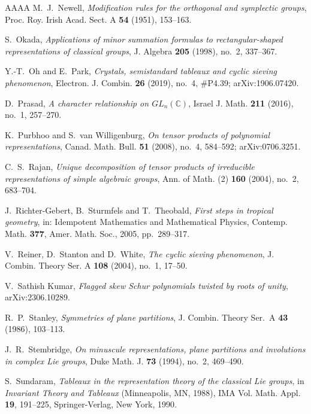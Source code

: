 \documentclass[11pt,reqno]{amsart}
\theoremstyle{plain}
\theoremstyle{definition}
\newcommand{\CC}{\mathbb{C}}
\begin{document}
\begin{thebibliography}{AAAA}
 M.~J.~Newell, \emph{Modification rules for the orthogonal and symplectic
groups}, Proc. Roy. Irish Acad. Sect. A \textbf{54} (1951), 153--163.

 S.~Okada, \emph{Applications of minor summation formulas to
rectangular-shaped representations of classical groups}, J. Algebra \textbf{205} (1998), no.~2,
337--367.

 Y.-T.~Oh and E.~Park, \emph{Crystals, semistandard tableaux and cyclic sieving
phenomenon}, Electron. J. Combin. \textbf{26} (2019), no.~4, \#P4.39; arXiv:1906.07420.

 D.~Prasad, \emph{A character relationship on $GL_n(\CC)$}, Israel J. Math.
\textbf{211} (2016), no.~1, 257--270.

 K.~Purbhoo and S.~van Willigenburg, \emph{On tensor products of polynomial
representations}, Canad. Math. Bull. \textbf{51} (2008), no.~4, 584--592; arXiv:0706.3251.

 C.~S.~Rajan, \emph{Unique decomposition of tensor products of irreducible
representations of simple algebraic groups}, Ann. of Math. (2) \textbf{160} (2004), no.~2, 683--704.

 J.~Richter-Gebert, B.~Sturmfels and T.~Theobald, \emph{First steps in
tropical geometry}, in: Idempotent Mathematics and Mathematical Physics, Contemp. Math. \textbf{377},
Amer. Math. Soc., 2005, pp.~289--317.

 V.~Reiner, D.~Stanton and D.~White, \emph{The cyclic sieving phenomenon},
J. Combin. Theory Ser. A \textbf{108} (2004), no.~1, 17--50.

 V.~Sathish Kumar, \emph{Flagged skew Schur polynomials twisted by roots of
unity}, arXiv:2306.10289.

 R.~P.~Stanley, \emph{Symmetries of plane partitions}, J. Combin. Theory
Ser.~A \textbf{43} (1986), 103--113.

 J.~R.~Stembridge, \emph{On minuscule representations, plane partitions and
involutions in complex Lie groups}, Duke Math. J. \textbf{73} (1994), no.~2, 469--490.

 S.~Sundaram, \emph{Tableaux in the representation theory of the classical Lie
groups}, in \emph{Invariant Theory and Tableaux} (Minneapolis, MN, 1988), IMA Vol. Math. Appl.
\textbf{19}, 191--225, Springer-Verlag, New York, 1990.

\end{thebibliography}
\end{document}

